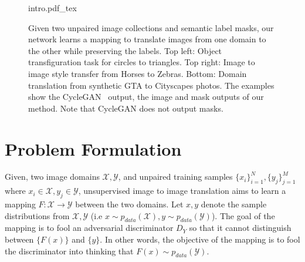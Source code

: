 \begin{figure*}[!htbp]
    \centering
    \def\svgwidth{\textwidth}
    {intro.pdf_tex}
    \caption{Given two unpaired image collections and semantic label masks, our network learns a mapping to translate images from one domain to the other while preserving the labels. Top left: Object transfiguration task for circles to triangles. Top right: Image to image style transfer from Horses to Zebras. Bottom: Domain translation from synthetic GTA to Cityscapes photos. The examples show the CycleGAN~\cite{zhu_unpaired_2017} output, the image and mask outputs of our method. Note that CycleGAN does not output masks.\label{fig:intro}}
    
\end{figure*}


\section{Problem Formulation}
Given, two image domains $\mathcal{X}, \mathcal{Y}$, and unpaired training samples $\{x_i\}_{i=1}^N, \{y_j\}_{j=1}^M$ where $x_i\in \mathcal{X}, y_j \in \mathcal{Y}$, unsupervised image to image translation aims to learn a mapping $F:\mathcal{X}\to\mathcal{Y}$ between the two domains. Let $x,y$ denote the sample distributions from $\mathcal{X},\mathcal{Y}$ (i.e $x\sim p_{data}(\mathcal{X}), y \sim p_{data}(\mathcal{Y})$). The goal of the mapping is to fool an adversarial discriminator $D_Y$ so that it cannot distinguish between $\{F(x)\}$ and $\{y\}$. In other words, the objective of the mapping is to fool the discriminator into thinking that $F(x) \sim p_{data}(\mathcal{Y})$.

